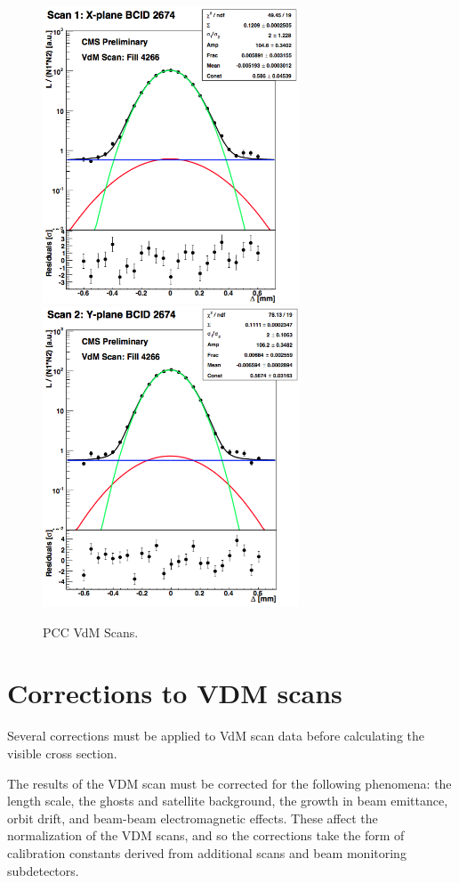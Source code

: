\begin{figure}[h!]
\begin{centering}
\includegraphics[width=3in]{Chapter4/importfigs/CMS-PAS-LUM-15-001_Figure_005-a.png}
\includegraphics[width=3in]{Chapter4/importfigs/CMS-PAS-LUM-15-001_Figure_005-b.png}
\par\end{centering}
\caption{PCC VdM Scans. \label{fig:pccVdMScans}}
\end{figure}

\section{Corrections to VDM scans}

Several corrections must be applied to VdM scan data before calculating the visible cross section. 

The results of the VDM scan must be corrected for the following phenomena: the length scale, the ghosts and satellite background, the growth in beam emittance, orbit drift, and beam-beam electromagnetic effects. These affect the normalization of the VDM scans, and so the corrections take the form of calibration constants derived from additional scans and beam monitoring subdetectors. 

